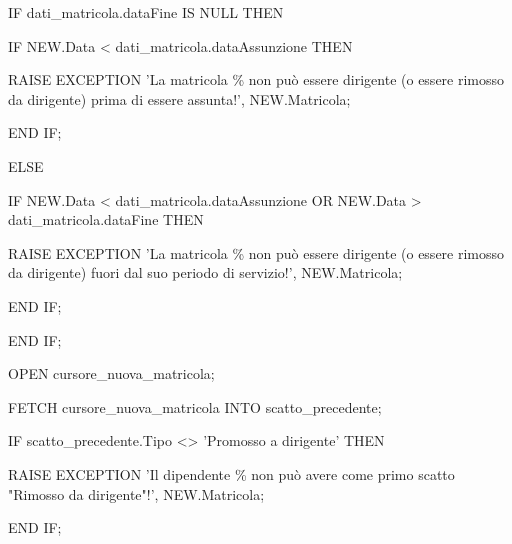 \begin{flushleft}
\begin{description}
\begin{description}
                        \item  IF dati\_matricola.dataFine IS NULL THEN
                        \begin{description}
                            \item  IF NEW.Data < dati\_matricola.dataAssunzione THEN
                            \begin{description}
                                \item RAISE EXCEPTION 'La matricola \% non può essere dirigente (o essere rimosso da dirigente) prima di essere assunta!', NEW.Matricola;
                            \end{description}
                            \item END IF;
                        \end{description}

                        \item ELSE 
                        \begin{description}
                            \item IF NEW.Data < dati\_matricola.dataAssunzione OR NEW.Data > dati\_matricola.dataFine THEN
                            \begin{description}
                                \item RAISE EXCEPTION 'La matricola \% non può essere dirigente (o essere rimosso da dirigente) fuori dal suo periodo di servizio!', NEW.Matricola;
                            \end{description}
                                \item END IF;
                        \end{description}
                        \item END IF;
                        
                        \vspace{0.5cm}
                        
                        \item OPEN cursore\_nuova\_matricola;
                        \item FETCH cursore\_nuova\_matricola INTO scatto\_precedente;
                        
                        \vspace{0.5cm}
                        
                        \item IF scatto\_precedente.Tipo <> 'Promosso a dirigente' THEN
                        \begin{description}
                            \item RAISE EXCEPTION 'Il dipendente \% non può avere come primo scatto "Rimosso da dirigente"!', NEW.Matricola;
                        \end{description}
                        \item END IF;


\end{description}
\end{description}
\end{flushleft}
